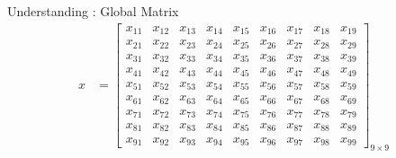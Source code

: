 \begin{frame}
\begin{exampleblock}{Understanding : Global Matrix}
\begin{align*}
x &= \left[
      \begin{array}{lllllllll}
      x_{11} & x_{12} & x_{13} & x_{14} & x_{15} & x_{16} & x_{17} & x  _{18} & 
x_{19}\\
      x_{21} & x_{22} & x_{23} & x_{24} & x_{25} & x_{26} & x_{27} & x  _{28} & 
x_{29}\\
      x_{31} & x_{32} & x_{33} & x_{34} & x_{35} & x_{36} & x_{37} & x  _{38} & 
x_{39}\\
      x_{41} & x_{42} & x_{43} & x_{44} & x_{45} & x_{46} & x_{47} & x  _{48} & 
x_{49}\\
      x_{51} & x_{52} & x_{53} & x_{54} & x_{55} & x_{56} & x_{57} & x  _{58} & 
x_{59}\\
      x_{61} & x_{62} & x_{63} & x_{64} & x_{65} & x_{66} & x_{67} & x  _{68} & 
x_{69}\\
      x_{71} & x_{72} & x_{73} & x_{74} & x_{75} & x_{76} & x_{77} & x  _{78} & 
x_{79}\\
      x_{81} & x_{82} & x_{83} & x_{84} & x_{85} & x_{86} & x_{87} & x  _{88} & 
x_{89}\\
      x_{91} & x_{92} & x_{93} & x_{94} & x_{95} & x_{96} & x_{97} & x  _{98} & 
x_{99}
      \end{array}
\right]_{9\times 9}
\end{align*}
\end{exampleblock}
\end{frame}



